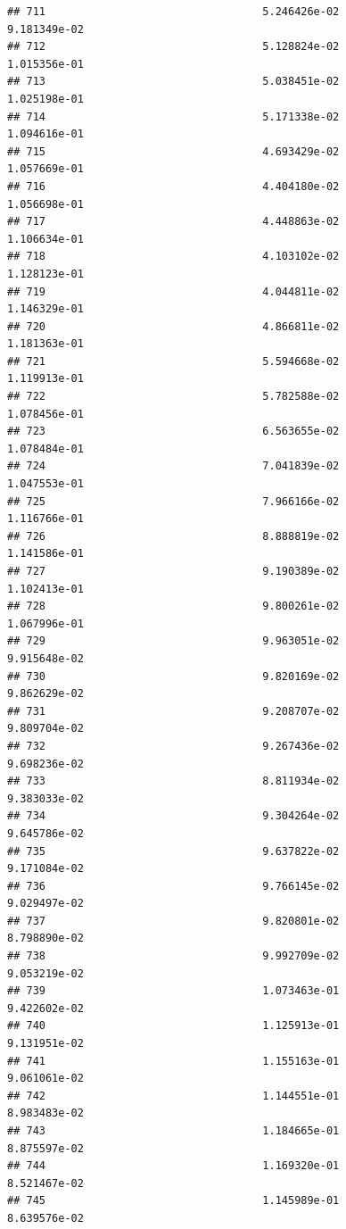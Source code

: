\documentclass[
]{article}
\begin{document}
\begin{verbatim}
## 711                                  5.246426e-02           9.181349e-02
## 712                                  5.128824e-02           1.015356e-01
## 713                                  5.038451e-02           1.025198e-01
## 714                                  5.171338e-02           1.094616e-01
## 715                                  4.693429e-02           1.057669e-01
## 716                                  4.404180e-02           1.056698e-01
## 717                                  4.448863e-02           1.106634e-01
## 718                                  4.103102e-02           1.128123e-01
## 719                                  4.044811e-02           1.146329e-01
## 720                                  4.866811e-02           1.181363e-01
## 721                                  5.594668e-02           1.119913e-01
## 722                                  5.782588e-02           1.078456e-01
## 723                                  6.563655e-02           1.078484e-01
## 724                                  7.041839e-02           1.047553e-01
## 725                                  7.966166e-02           1.116766e-01
## 726                                  8.888819e-02           1.141586e-01
## 727                                  9.190389e-02           1.102413e-01
## 728                                  9.800261e-02           1.067996e-01
## 729                                  9.963051e-02           9.915648e-02
## 730                                  9.820169e-02           9.862629e-02
## 731                                  9.208707e-02           9.809704e-02
## 732                                  9.267436e-02           9.698236e-02
## 733                                  8.811934e-02           9.383033e-02
## 734                                  9.304264e-02           9.645786e-02
## 735                                  9.637822e-02           9.171084e-02
## 736                                  9.766145e-02           9.029497e-02
## 737                                  9.820801e-02           8.798890e-02
## 738                                  9.992709e-02           9.053219e-02
## 739                                  1.073463e-01           9.422602e-02
## 740                                  1.125913e-01           9.131951e-02
## 741                                  1.155163e-01           9.061061e-02
## 742                                  1.144551e-01           8.983483e-02
## 743                                  1.184665e-01           8.875597e-02
## 744                                  1.169320e-01           8.521467e-02
## 745                                  1.145989e-01           8.639576e-02

\end{verbatim}
\end{document}
